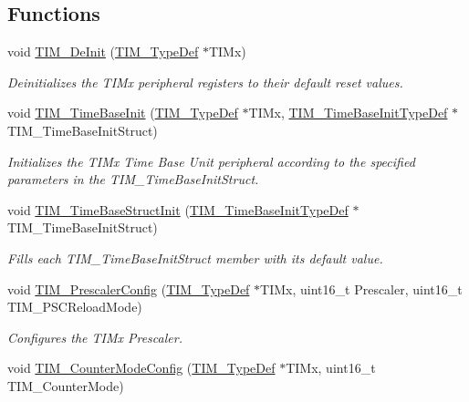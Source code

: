 \subsection*{Functions}
\begin{DoxyCompactItemize}
\item 
void \hyperlink{group___t_i_m_ga1659cc0ce503ac151568e0c7c02b1ba5}{T\+I\+M\+\_\+\+De\+Init} (\hyperlink{struct_t_i_m___type_def}{T\+I\+M\+\_\+\+Type\+Def} $\ast$T\+I\+Mx)
\begin{DoxyCompactList}\small\item\em Deinitializes the T\+I\+Mx peripheral registers to their default reset values. \end{DoxyCompactList}\item 
void \hyperlink{group___t_i_m_ga83fd58c9416802d9638bbe1715c98932}{T\+I\+M\+\_\+\+Time\+Base\+Init} (\hyperlink{struct_t_i_m___type_def}{T\+I\+M\+\_\+\+Type\+Def} $\ast$T\+I\+Mx, \hyperlink{struct_t_i_m___time_base_init_type_def}{T\+I\+M\+\_\+\+Time\+Base\+Init\+Type\+Def} $\ast$T\+I\+M\+\_\+\+Time\+Base\+Init\+Struct)
\begin{DoxyCompactList}\small\item\em Initializes the T\+I\+Mx Time Base Unit peripheral according to the specified parameters in the T\+I\+M\+\_\+\+Time\+Base\+Init\+Struct. \end{DoxyCompactList}\item 
void \hyperlink{group___t_i_m_ga1556a0b9a5d53506875fd7de0cbc6b1f}{T\+I\+M\+\_\+\+Time\+Base\+Struct\+Init} (\hyperlink{struct_t_i_m___time_base_init_type_def}{T\+I\+M\+\_\+\+Time\+Base\+Init\+Type\+Def} $\ast$T\+I\+M\+\_\+\+Time\+Base\+Init\+Struct)
\begin{DoxyCompactList}\small\item\em Fills each T\+I\+M\+\_\+\+Time\+Base\+Init\+Struct member with its default value. \end{DoxyCompactList}\item 
void \hyperlink{group___t_i_m_ga45c6fd9041baf7f64c121e0172f305c7}{T\+I\+M\+\_\+\+Prescaler\+Config} (\hyperlink{struct_t_i_m___type_def}{T\+I\+M\+\_\+\+Type\+Def} $\ast$T\+I\+Mx, uint16\+\_\+t Prescaler, uint16\+\_\+t T\+I\+M\+\_\+\+P\+S\+C\+Reload\+Mode)
\begin{DoxyCompactList}\small\item\em Configures the T\+I\+Mx Prescaler. \end{DoxyCompactList}\item 
void \hyperlink{group___t_i_m_ga93941c1db20bf3794f377307df90a67b}{T\+I\+M\+\_\+\+Counter\+Mode\+Config} (\hyperlink{struct_t_i_m___type_def}{T\+I\+M\+\_\+\+Type\+Def} $\ast$T\+I\+Mx, uint16\+\_\+t T\+I\+M\+\_\+\+Counter\+Mode)

\end{DoxyCompactItemize}
